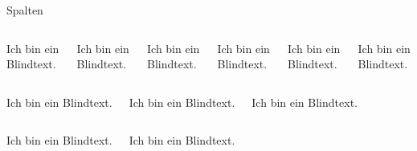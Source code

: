 \documentclass{sdqbeamer}
\begin{document}
\begin{frame}{Spalten}
	\begin{columns}
		\column{\kitcolumn}	
		\begin{standardbox}
			Ich bin ein Blindtext.
		\end{standardbox}
		\column{\kitcolumn}	
		\begin{highlightbox}
			Ich bin ein Blindtext.
		\end{highlightbox}
		\column{\kitcolumn}	
		\begin{grayhighlightbox}
			Ich bin ein Blindtext.
		\end{grayhighlightbox}
		\column{\kitcolumn}	
		\begin{lightgrayhighlightbox}
			Ich bin ein Blindtext.
		\end{lightgrayhighlightbox}
		\column{\kitcolumn}	
		\begin{standardbox}
			Ich bin ein Blindtext.
		\end{standardbox}
		\column{\kitcolumn}	
		\begin{standardbox}
			Ich bin ein Blindtext.
		\end{standardbox}
	\end{columns}
	\vspace{1em}
	\begin{columns}
		\column{\kittwocolumns}	
		\begin{standardbox}
			Ich bin ein Blindtext.
		\end{standardbox}
		\column{\kittwocolumns}	
		\begin{highlightbox}
			Ich bin ein Blindtext.
		\end{highlightbox}
		\column{\kittwocolumns}	
		\begin{grayhighlightbox}
			Ich bin ein Blindtext.
		\end{grayhighlightbox}
	\end{columns}
	\vspace{1em}
	\begin{columns}
		\column{\kitthreecolumns}	
		\begin{standardbox}
			Ich bin ein Blindtext.
		\end{standardbox}
		\column{\kitthreecolumns}	
		\begin{highlightbox}
			Ich bin ein Blindtext.
		\end{highlightbox}
	\end{columns}
\end{frame}
\end{document}
